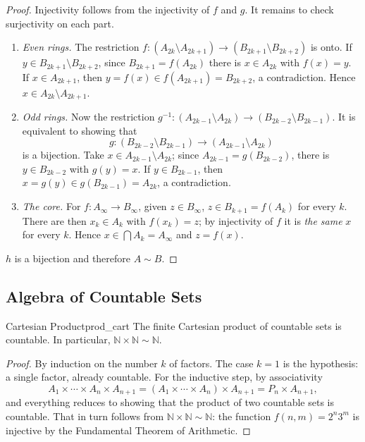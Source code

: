 \documentclass[11pt, a4paper]{article}
\begin{document}
\begin{proof}
Injectivity follows from the injectivity of $f$ and $g$. It remains to check surjectivity on each part.

\begin{enumerate}
    \item \textit{Even rings.} The restriction
    $f: (A_{2k} \setminus A_{2k+1}) \to (B_{2k+1} \setminus B_{2k+2})$ is onto. If
    $y \in B_{2k+1} \setminus B_{2k+2}$, since $B_{2k+1} = f(A_{2k})$ there is $x \in A_{2k}$ with
    $f(x) = y$. If $x \in A_{2k+1}$, then $y = f(x) \in f(A_{2k+1}) = B_{2k+2}$, a contradiction.
    Hence $x \in A_{2k} \setminus A_{2k+1}$.

    \item \textit{Odd rings.} Now the restriction
    $g^{-1}: (A_{2k-1} \setminus A_{2k}) \to (B_{2k-2} \setminus B_{2k-1})$. It is equivalent to showing that
    $$ g: (B_{2k-2} \setminus B_{2k-1}) \to (A_{2k-1} \setminus A_{2k}) $$
    is a bijection. Take $x \in A_{2k-1} \setminus A_{2k}$; since $A_{2k-1} = g(B_{2k-2})$, there is
    $y \in B_{2k-2}$ with $g(y) = x$. If $y \in B_{2k-1}$, then
    $x = g(y) \in g(B_{2k-1}) = A_{2k}$, a contradiction.

    \item \textit{The core.} For $f: A_\infty \to B_\infty$, given $z \in B_\infty$,
    $z \in B_{k+1} = f(A_k)$ for every $k$. There are then $x_k \in A_k$ with $f(x_k) = z$; by
    injectivity of $f$ it is \emph{the same} $x$ for every $k$. Hence
    $x \in \bigcap A_k = A_\infty$ and $z = f(x)$.
\end{enumerate}
$h$ is a bijection and therefore $A \sim B$.
\end{proof}

\subsection{Algebra of Countable Sets}

\begin{teorema}{Cartesian Product}{prod_cart}
The finite Cartesian product of countable sets is countable. In particular,
$\mathbb{N} \times \mathbb{N} \sim \mathbb{N}$.
\end{teorema}
\begin{proof}
By induction on the number $k$ of factors. The case $k=1$ is the hypothesis: a single
factor, already countable. For the inductive step, by associativity
$$ A_1 \times \cdots \times A_n \times A_{n+1} = (A_1 \times \cdots \times A_n) \times A_{n+1} = P_n
\times A_{n+1}, $$
and everything reduces to showing that the product of two countable sets is countable. That in turn follows
from $\mathbb{N} \times \mathbb{N} \sim \mathbb{N}$: the function $f(n,m) = 2^n 3^m$ is
injective by the Fundamental Theorem of Arithmetic.
\end{proof}
\end{document}
